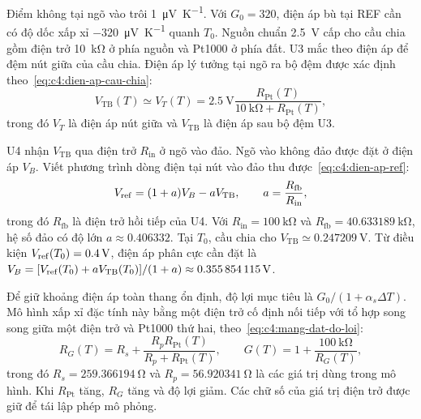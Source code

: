 Điểm không tại ngõ vào trôi \qty{1}{\micro\volt\per\kelvin}.
Với $G_0=320$, điện áp bù tại REF cần có độ dốc xấp xỉ
\qty{-320}{\micro\volt\per\kelvin} quanh $T_0$.
Nguồn chuẩn \qty{2.5}{\volt} cấp cho cầu chia gồm điện trở
\qty{10}{\kilo\ohm} ở phía nguồn và Pt1000 ở phía đất.
U3 mắc theo điện áp để đệm nút giữa của cầu chia. Điện áp lý tưởng tại
ngõ ra bộ đệm được xác định theo~\eqref{eq:c4:dien-ap-cau-chia}:
\begin{equation}
    V_{\mathrm{TB}}(T)\simeq V_T(T)
    =\qty{2.5}{\volt}
     \frac{R_{\mathrm{Pt}}(T)}
          {\qty{10}{\kilo\ohm}+R_{\mathrm{Pt}}(T)},
    \label{eq:c4:dien-ap-cau-chia}
\end{equation}
trong đó $V_T$ là điện áp nút giữa và $V_{\mathrm{TB}}$ là điện áp
sau bộ đệm U3.

U4 nhận $V_{\mathrm{TB}}$ qua điện trở $R_{\mathrm{in}}$ ở ngõ vào đảo.
Ngõ vào không đảo được đặt ở điện áp $V_B$. Viết phương trình dòng điện
tại nút vào đảo thu được~\eqref{eq:c4:dien-ap-ref}:
\begin{equation}
    V_{\mathrm{ref}}=(1+a)V_B-aV_{\mathrm{TB}},
    \qquad a=\frac{R_{\mathrm{fb}}}{R_{\mathrm{in}}},
    \label{eq:c4:dien-ap-ref}
\end{equation}
trong đó $R_{\mathrm{fb}}$ là điện trở hồi tiếp của U4.
Với $R_{\mathrm{in}}=\qty{100}{\kilo\ohm}$ và
$R_{\mathrm{fb}}=\qty{40.633189}{\kilo\ohm}$, hệ số đảo có độ lớn
$a\approx0.406332$. Tại $T_0$, cầu chia cho
$V_{\mathrm{TB}}\simeq\qty{0.247209}{\volt}$.
Từ điều kiện $V_{\mathrm{ref}}(T_0)=\qty{0.4}{\volt}$, điện áp phân cực cần đặt là
$V_B=[V_{\mathrm{ref}}(T_0)+aV_{\mathrm{TB}}(T_0)]/(1+a)
\approx\qty{0.355854115}{\volt}$.

Để giữ khoảng điện áp toàn thang ổn định, độ lợi mục tiêu là
$G_0/(1+\alpha_s\Delta T)$. Mô hình xấp xỉ đặc tính này bằng một
điện trở cố định nối tiếp với tổ hợp song song giữa một điện trở và
Pt1000 thứ hai, theo~\eqref{eq:c4:mang-dat-do-loi}:
\begin{equation}
    R_G(T)=R_s+
    \frac{R_pR_{\mathrm{Pt}}(T)}{R_p+R_{\mathrm{Pt}}(T)},
    \qquad
    G(T)=1+\frac{\qty{100}{\kilo\ohm}}{R_G(T)},
    \label{eq:c4:mang-dat-do-loi}
\end{equation}
trong đó $R_s=\qty{259.366194}{\ohm}$ và
$R_p=\qty{56.920341}{\ohm}$ là các giá trị dùng trong mô hình.
Khi $R_{\mathrm{Pt}}$ tăng, $R_G$ tăng và độ lợi giảm.
Các chữ số của giá trị điện trở được giữ để tái lập phép mô phỏng.


